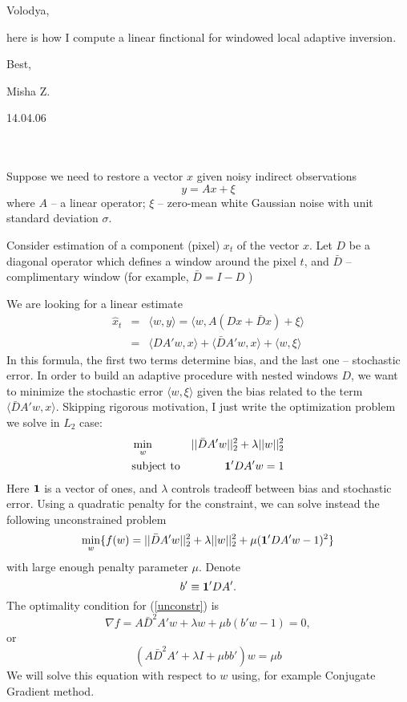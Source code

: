 \documentclass{article}
\newcommand{\lam}{\lambda}
\newcommand{\beq}{\begin{equation}}
\def\eeq{\end{equation}}
\begin{document}

\author{Michael Zibulevsky}

Volodya, 

here is how I compute  a linear finctional for 
windowed local adaptive inversion.

Best,

Misha Z.

14.04.06

\ \\
\ \\


Suppose we need to restore a vector $x$ given noisy indirect observations
\beq
y=Ax+\xi
\eeq
where $A$ -- a linear operator; $\xi$ -- zero-mean white Gaussian noise with 
unit standard deviation $ \sigma$.

Consider estimation of a component (pixel) $x_t$ of the vector $x$.
Let  $D$ be a diagonal operator which defines a window around the pixel $t$,
and $\bar{D}$ -- complimentary window (for example, $\bar{D}= I -D$ )

We are looking for a linear estimate
\begin{eqnarray}
\hat{x}_t &=& \langle w, y \rangle = \langle w,  A(Dx+\bar{D}x) + \xi \rangle \\
&=& \langle DA'w,x\rangle + \langle\bar{D}A'w,x\rangle +  \langle w, \xi \rangle
\end{eqnarray}
In this formula, the first two terms determine bias, and the last one -- stochastic error.
In order to build an adaptive procedure with nested windows $D$,  we want to 
minimize  the stochastic error  $\langle w, \xi \rangle$ given the bias related to the 
term $\langle\bar{D}A'w,x\rangle$.
Skipping  rigorous motivation,  I just write the optimization problem
we solve in $L_2$ case:
\begin{eqnarray}
 &\min_w& ||{\bar{D}A'w}||_2^2 + \lam ||w||_2^2 \\
 &\mbox{subject to}& {\bf 1'}DA'w=1
 \end{eqnarray}
Here ${\bf 1}$ is a vector of ones, and $\lam$ controls tradeoff between bias and stochastic error.
Using a quadratic penalty for the constraint, we can solve instead the following
unconstrained problem 
\beq
\min_w \{f(w)= ||{\bar{D}A'w}||_2^2 + \lam ||w||_2^2+\mu ( {\bf 1'}DA'w-1)^2 \}
\label{unconstr}
\eeq
with large enough penalty parameter $\mu$.
Denote 
$$ b' \equiv {\bf1'}DA'. $$
The optimality condition for (\ref{unconstr}) is
\beq
\nabla f = A \bar{D}^2A'w +\lam w +\mu b(b'w-1)=0,
\eeq
or
\beq
(A \bar{D}^2A'  + \lam I +\mu bb')w=\mu b
\eeq
We will solve this equation with respect to $w$ using, for example Conjugate Gradient method.
\end{document}
